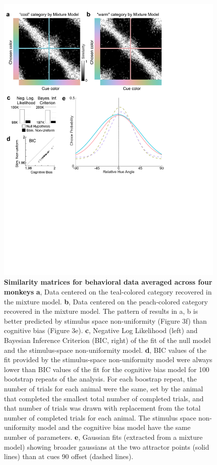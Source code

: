 \documentclass[9pt,biorxiv,lineno,onehalfspacing]{lapreprint}
\begin{document}
\begin{refsection}
\begin{figure}
    \begin{fullwidth}
    \centering
    \includegraphics[width=\textwidth,trim={0 10cm 4cm 0},clip]{F4_TCCResults_4.pdf}
    \caption{\textbf{Similarity matrices for behavioral data averaged across four monkeys}
    \textbf{a}, Data centered on the teal-colored category recovered in the mixture model.  
	\textbf{b}, Data centered on the peach-colored category recovered in the mixture model. The pattern of results in a, b is better predicted by stimulus space non-uniformity (Figure 3f) than cognitive bias (Figure 3e). 
	\textbf{c}, Negative Log Likelihood (left) and Bayesian Inference Criterion (BIC, right) of the fit of the null model and the stimulus-space non-uniformity model. 
	\textbf{d}, BIC values of the fit provided by the stimulus-space non-uniformity model were always lower than BIC values of the fit for the cognitive bias model for 100 bootstrap repeats of the analysis. 
    For each boostrap repeat, the number of trials for each animal were the same, set by the animal that completed the smallest total number of completed trials, and that number of trials was drawn with replacement from the total number of completed trials for each animal. 
    The stimulus space non-uniformity model and the cognitive bias model have the same number of parameters. 
    \textbf{e}, Gaussian fits (extracted from a mixture model) showing broader gaussians at the two attractor points (solid lines) than at cues 90\degree{} offset (dashed lines).
    } 
    \label{fig:TCCOutput}
    \end{fullwidth}
\end{figure}


\end{refsection}
\end{document}
